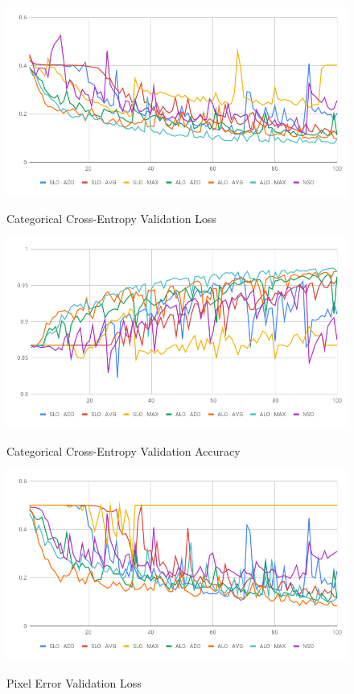 \begin{figure}
  \caption{Categorical Cross-Entropy Validation Loss}
  \centering
  \includegraphics[width=1.\columnwidth]{figures/falreis/validation_loss.png}
  \label{fig:validation_loss}
\end{figure}

\begin{figure}
  \caption{Categorical Cross-Entropy Validation Accuracy}
  \centering
  \includegraphics[width=1.\columnwidth]{figures/falreis/validation_accuracy.png}
  \label{fig:validation_accuracy}
\end{figure}

\begin{figure}
  \caption{Pixel Error Validation Loss}
  \centering
  \includegraphics[width=1.\columnwidth]{figures/falreis/pixel_error.png}
  \label{fig:pixel_error}
\end{figure}

